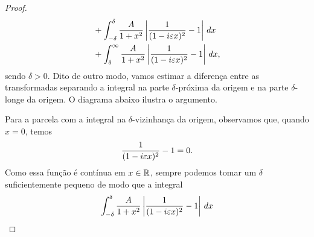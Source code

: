 \begin{proof}
\begin{align*}
                &+ \int_{-\delta}^{\delta} \frac{A}{1+ x^2}\left| \frac{1}{(1-i\varepsilon x)^2} - 1 \right| \, dx \\
                &+ \int_{\delta}^{\infty} \frac{A}{1+ x^2}\left| \frac{1}{(1-i\varepsilon x)^2} - 1 \right| \, dx,
            \end{align*}
            sendo $\delta > 0$. Dito de outro modo, vamos estimar a diferença entre as transformadas
            separando a integral na parte $\delta$-próxima da origem e na parte $\delta$-longe da origem.
            O diagrama abaixo ilustra o argumento.
            \begin{figure}[H]
                \centering
            \end{figure}
            Para a parcela com a integral na $\delta$-vizinhança da origem, observamos que, quando $x = 0$,
            temos
            \begin{equation*}
                \frac{1}{(1-i\varepsilon x)^2} - 1 = 0.
            \end{equation*}
            Como essa função é contínua em $x\in\mathbb{R}$, sempre podemos tomar um $\delta$ suficientemente pequeno
            de modo que a integral
            \begin{equation*}
                \int_{-\delta}^{\delta} \frac{A}{1+ x^2}\left| \frac{1}{(1-i\varepsilon x)^2} - 1 \right| \, dx
            \end{equation*}

\end{proof}
